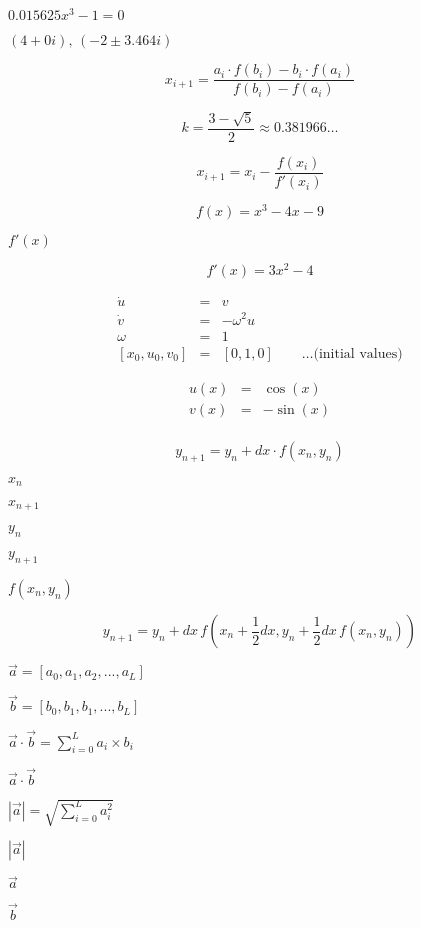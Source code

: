 \documentclass{article}
\begin{document}
$0.015625x^3-1=0$
\pagebreak

$(4+0i),\,(-2\pm3.464i)$
\pagebreak

\[
x_{i+1} = \frac{a_i\cdot f(b_i) - b_i\cdot f(a_i)}{f(b_i) - f(a_i)}
\]
\pagebreak

\[
k=\frac{3-\sqrt{5}}{2} \approx 0.381966\ldots\]
\pagebreak

\[
x_{i+1} = x_i - \frac{f(x_i)}{f'(x_i)}
\]
\pagebreak

\[
f(x) = x^3 - 4x - 9
\]
\pagebreak

$f'(x)$
\pagebreak

\[
f'(x) = 3x^2 - 4
\]
\pagebreak

\begin{eqnarray*}
   \dot{u} &=& v\\
   \dot{v} &=& -\omega^2 u\\
   \omega &=& 1\\
   [x_0, u_0, v_0] &=& [0,1,0]\qquad\ldots\text{(initial values)}
   \end{eqnarray*}
\pagebreak

\begin{eqnarray*}
   u(x) &=& \cos(x)\\
   v(x) &=& -\sin(x)\\
   \end{eqnarray*}
\pagebreak

\[y_{n+1}=y_n + dx\cdot f\left(x_n,y_n\right)\]
\pagebreak

$x_n$
\pagebreak

$x_{n+1}$
\pagebreak

$y_n$
\pagebreak

$y_{n+1}$
\pagebreak

$f\left(x_n,y_n\right)$
\pagebreak

\[y_{n+1} = y_n + dx\, f\left(x_n+\frac{1}{2}dx,
y_n + \frac{1}{2}dx\,f\left(x_n,y_n\right)\right)\]
\pagebreak

$\vec{a}=\left[a_0,a_1,a_2,...,a_L\right]$
\pagebreak

$\vec{b}=\left[b_0,b_1,b_1,...,b_L\right]$
\pagebreak

$\vec{a}\cdot\vec{b}=\displaystyle\sum_{i=0}^L a_i\times b_i$
\pagebreak

$\vec{a}\cdot\vec{b}$
\pagebreak

$\left|\vec{a}\right|=\sqrt{\displaystyle\sum_{i=0}^L a_i^2}$
\pagebreak

$\left|\vec{a}\right|$
\pagebreak

$\vec{a}$
\pagebreak

$\vec{b}$
\pagebreak
\end{document}
